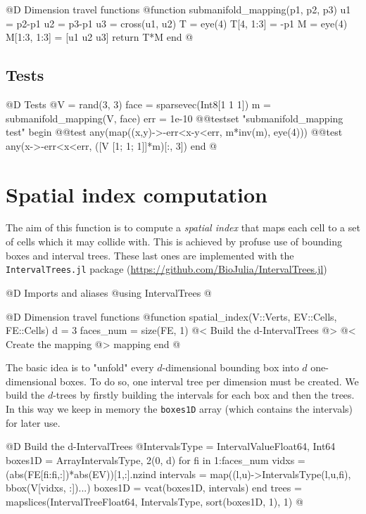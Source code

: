 @D Dimension travel functions
@{function submanifold_mapping(p1, p2, p3)
    u1 = p2-p1
    u2 = p3-p1
    u3 = cross(u1, u2)
    T = eye(4)
    T[4, 1:3] = -p1
    M = eye(4)
    M[1:3, 1:3] = [u1 u2 u3]
    return T*M
end
@}
\subsection{Tests}

@D Tests
@{V = rand(3, 3)
face = sparsevec(Int8[1 1 1])
m = submanifold_mapping(V, face)
err = 1e-10 
@@testset "submanifold_mapping test" begin
    @@test any(map((x,y)->-err<x-y<err, m*inv(m), eye(4)))
    @@test any(x->-err<x<err, ([V [1; 1; 1]]*m)[:, 3])
end
@}





\section{Spatial index computation}

The aim of this function is to compute a \textit{spatial index} that maps
each cell to a set of cells which it may collide with.
This is achieved by profuse use of bounding boxes and interval trees. 
These last ones are implemented with the \texttt{IntervalTrees.jl} package
(\url{https://github.com/BioJulia/IntervalTrees.jl})

@D Imports and aliases
@{using IntervalTrees
@}

@D Dimension travel functions
@{function spatial_index(V::Verts, EV::Cells, FE::Cells)
    d = 3
    faces_num = size(FE, 1)
    @< Build the d-IntervalTrees @>
    @< Create the mapping @>
    mapping
end
@}

The basic idea is to "unfold" every $d$-dimensional bounding box into $d$ one-dimensional boxes.
To do so, one interval tree per dimension must be created. 
We build the $d$-trees by firstly building the intervals for each box and then the trees.
In this way we keep in memory the \texttt{boxes1D} array (which contains the intervals) for later use.

@D Build the d-IntervalTrees
@{IntervalsType = IntervalValue{Float64, Int64}
boxes1D = Array{IntervalsType, 2}(0, d)
for fi in 1:faces_num
    vidxs = (abs(FE[fi:fi,:])*abs(EV))[1,:].nzind
    intervals = map((l,u)->IntervalsType(l,u,fi), bbox(V[vidxs, :])...)
    boxes1D = vcat(boxes1D, intervals)
end
trees = mapslices(IntervalTree{Float64, IntervalsType}, sort(boxes1D, 1), 1)
@}

